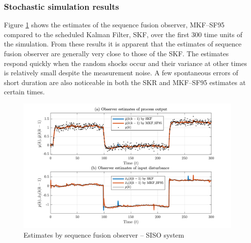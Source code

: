 \subsubsection{Stochastic simulation results} \label{sim-obs-lin-1-results}

Figure \ref{fig:rod-obs-sim1-yest-1-SF} shows the estimates of the sequence fusion observer, MKF--SF95 compared to the scheduled Kalman Filter, SKF, over the first 300 time units of the simulation. From these results it is apparent that the estimates of sequence fusion observer are generally very close to those of the SKF. The estimates respond quickly when the random shocks occur and their variance at other times is relatively small despite the measurement noise. A few spontaneous errors of short duration are also noticeable in both the SKR and MKF--SF95 estimates at certain times.
\begin{figure}[htp]
	\centering
	\includegraphics[width=13cm]{images/rod_obs_sim1_all_seed_y_est1_SF95.pdf}
	\caption{Estimates by sequence fusion observer – SISO system}
	\label{fig:rod-obs-sim1-yest-1-SF}
\end{figure}


